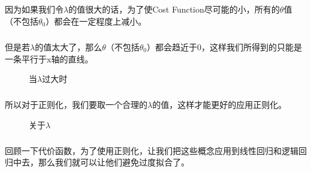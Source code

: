 \documentclass{article}
\begin{document}
\begin{CJK}{UTF8}{gbsn}
\subparagraph{}
因为如果我们令$\lambda$的值很大的话，为了使Cost Function尽可能的小，所有的$\theta$值（不包括$\theta_0$）都会在一定程度上减小。
\subparagraph{}
但是若$\lambda$的值太大了，那么$\theta$（不包括$\theta_0$）都会趋近于0，这样我们所得到的只能是一条平行于x轴的直线。
\begin{figure}[H]
\caption{当$\lambda$过大时}
\label{fig:364}
\end{figure}
\subparagraph{}
所以对于正则化，我们要取一个合理的$\lambda$的值，这样才能更好的应用正则化。
\begin{figure}[H]
\caption{关于$\lambda$}
\label{fig:363}
\end{figure}
\subparagraph{}
回顾一下代价函数，为了使用正则化，让我们把这些概念应用到线性回归和逻辑回归中去，那么我们就可以让他们避免过度拟合了。

\end{CJK}
\end{document}
